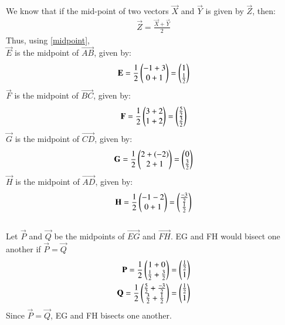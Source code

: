 \documentclass[journal,12pt,twocolumn]{IEEEtran}
\begin{document}
We know that if the mid-point of two vectors $\vec{X}$ and $\vec{Y}$ is given by $\vec{Z}$, then:
\begin{align}
    \vec{Z} = \frac{\vec{X} + \vec{Y}}{2}
    \label{midpoint}
\end{align}
Thus, using \eqref{midpoint},\\
$\vec{E}$ is the midpoint of $\vec{AB}$, given by:
\begin{align}
    \mathbf{E} = \frac{1}{2}\begin{pmatrix}-1+3\\0+1\end{pmatrix} = \begin{pmatrix}1\\\frac{1}{2}\end{pmatrix}
\end{align}
$\vec{F}$ is the midpoint of $\vec{BC}$, given by:
\begin{align}
    \mathbf{F} = \frac{1}{2}\begin{pmatrix}3+2\\1+2\end{pmatrix} = \begin{pmatrix}\frac{5}{2}\\\frac{3}{2}\end{pmatrix}
\end{align}
$\vec{G}$ is the midpoint of $\vec{CD}$, given by:
\begin{align}
    \mathbf{G} = \frac{1}{2}\begin{pmatrix}2+(-2)\\2+1\end{pmatrix} = \begin{pmatrix}0\\\frac{3}{2}\end{pmatrix}
\end{align}
$\vec{H}$ is the midpoint of $\vec{AD}$, given by:
\begin{align}
    \mathbf{H} = \frac{1}{2}\begin{pmatrix}-1-2\\0+1\end{pmatrix} = \begin{pmatrix}\frac{-3}{2}\\\frac{1}{2}\end{pmatrix}
\end{align}\\
Let $\vec{P}$ and $\vec{Q}$ be the midpoints of $\vec{EG}$ and $\vec{FH}$. EG and FH would bisect one another if $\vec{P} = \vec{Q}$
\begin{align}
    \mathbf{P} = \frac{1}{2}\begin{pmatrix}1+0\\\frac{1}{2} + \frac{3}{2}\end{pmatrix} = \begin{pmatrix}\frac{1}{2}\\1\end{pmatrix}\\
    \mathbf{Q} = \frac{1}{2}\begin{pmatrix}\frac{5}{2} + \frac{-3}{2}\\\frac{3}{2} + \frac{1}{2}\end{pmatrix} = \begin{pmatrix}\frac{1}{2}\\1\end{pmatrix}
\end{align}
Since $\vec{P} = \vec{Q}$, EG and FH bisects one another.
\end{document}

